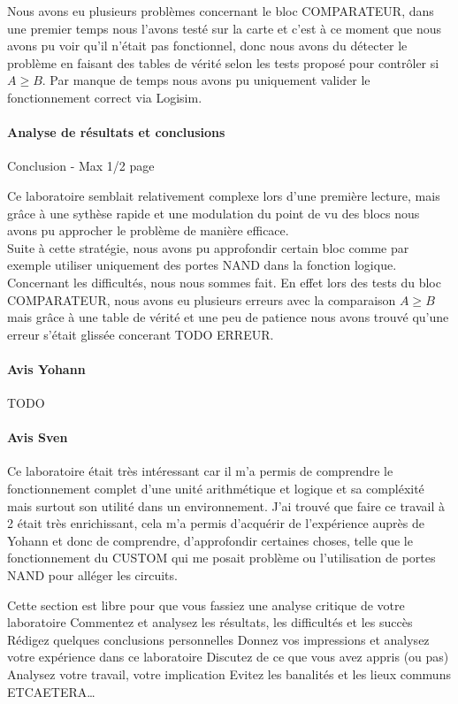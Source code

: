 \documentclass[a4paper]{article}
\begin{document}
\begin{tcolorbox}[colframe=Monokaimagenta,colback=white]
Nous avons eu plusieurs problèmes concernant le bloc COMPARATEUR, dans une premier temps nous l'avons testé sur la carte et c'est à ce moment que nous avons pu voir qu'il n'était pas fonctionnel, donc nous avons du détecter le problème en faisant des tables de vérité selon les tests proposé pour contrôler si $A \ge B$. Par manque de temps nous avons pu uniquement valider le fonctionnement correct via Logisim.
\end{tcolorbox}

\paragraph{Analyse de résultats et conclusions}
\begin{tcolorbox}[colframe=Monokaimagenta,colback=white]
Conclusion - Max 1/2 page 

Ce laboratoire semblait relativement complexe lors d'une première lecture, mais grâce à une sythèse rapide et une modulation du point de vu des blocs nous avons pu approcher le problème de manière efficace.\\
Suite à cette stratégie, nous avons pu approfondir certain bloc comme par exemple utiliser uniquement des portes NAND dans la fonction logique.
Concernant les difficultés, nous nous sommes fait. En effet lors des tests du bloc COMPARATEUR, nous avons eu plusieurs erreurs avec la comparaison $A \ge B$ mais grâce à une table de vérité et une peu de patience nous avons trouvé qu'une erreur s'était glissée concerant TODO ERREUR.
\paragraph{Avis Yohann}
TODO
\paragraph{Avis Sven}
Ce laboratoire était très intéressant car il m'a permis de comprendre le fonctionnement complet d'une unité arithmétique et logique et sa compléxité mais surtout son utilité dans un environnement. J'ai trouvé que faire ce travail à 2 était très enrichissant, cela m'a permis d'acquérir de l'expérience auprès de Yohann et donc de comprendre, d'approfondir certaines choses, telle que le fonctionnement du CUSTOM qui me posait problème ou l'utilisation de portes NAND pour alléger les circuits.

Cette section est libre pour que vous fassiez une analyse critique de votre laboratoire
Commentez et analysez 
les résultats, 
les difficultés et les succès
Rédigez quelques conclusions personnelles
Donnez vos impressions et analysez votre expérience dans ce laboratoire
Discutez de ce que vous avez appris (ou pas)
Analysez votre travail, votre implication
Evitez les banalités et les lieux communs
ETCAETERA…
\end{tcolorbox}
\end{document}
